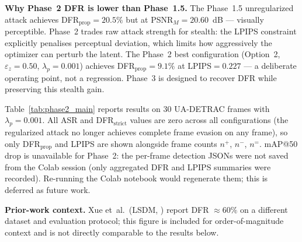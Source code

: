 \documentclass[12pt,a4paper]{report}
\begin{document}
\noindent\textbf{Why Phase~2 DFR is lower than Phase~1.5.}
The Phase~1.5 unregularized attack achieves DFR$_{\text{prop}}{=}20.5\%$ but at
PSNR$_M{=}20.60$~dB — visually perceptible. Phase~2 trades raw attack strength for
stealth: the LPIPS constraint explicitly penalises perceptual deviation, which limits
how aggressively the optimizer can perturb the latent. The Phase~2 best configuration
(Option~2, $\varepsilon_z{=}0.50$, $\lambda_p{=}0.001$) achieves DFR$_{\text{prop}}{=}9.1\%$
at LPIPS$=0.227$ — a deliberate operating point, not a regression. Phase~3 is designed
to recover DFR while preserving this stealth gain.

Table~\ref{tab:phase2_main} reports results on 30 UA-DETRAC frames with
$\lambda_p{=}0.001$. All ASR and DFR$_{\text{strict}}$ values are zero across all
configurations (the regularized attack no longer achieves complete frame evasion on
any frame), so only DFR$_{\text{prop}}$ and LPIPS are shown alongside frame counts
$n^+$, $n^-$, $n^=$. mAP@50 drop is unavailable for Phase~2: the per-frame detection
JSONs were not saved from the Colab session (only aggregated
DFR and LPIPS summaries were recorded). Re-running the Colab
notebook would regenerate them; this is deferred as future work.

\noindent\textbf{Prior-work context.}
Xue et~al.\ (LSDM, \cite{xue2023diffusion}) report DFR $\approx60\%$ on a
different dataset and evaluation protocol; this figure is included for
order-of-magnitude context and is not directly comparable to the results below.
\end{document}
